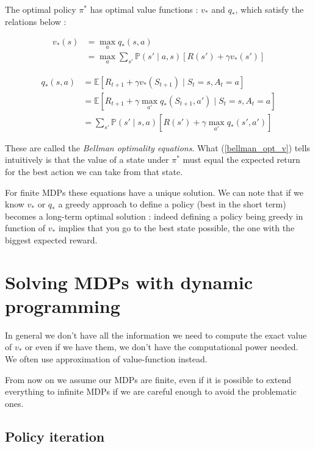 \documentclass[14pt,a4paper]{article}
\theoremstyle{definition}
\begin{document}
The optimal policy $\pi^*$ has  optimal value functions : $v_* $ and $ q_*$, which satisfy the relations below : 

\begin{equation}
\begin{split}
v_{*}(s)&=\max_{a}q_{*}(s,a)
\\&=\max_{a} \sum_{s'}\mathbb{P}(s'\mid a,s)\left[R(s')+\gamma v_{*}(s')\right]
\end{split}
\label{bellman_opt_v}
\end{equation}

\begin{equation}
\begin{split}
q_{*}(s,a)&=\mathbb{E}\left[ R_{t+1} + \gamma v_{*}(S_ {t+1}) \mid S_t = s, A_t = a \right]
\\&=\mathbb{E}\left[ R_{t+1} + \gamma \max_{a'} q_{*}(S_{t+1},a') \mid S_t = s, A_t = a \right]
\\&= \sum_{s'}\mathbb{P}(s' \mid s,a)[R(s')+\gamma \max_{a'}q_{*}(s',a')]
\end{split}
\label{bellman_opt_q}
\end{equation}

These are called the \emph{Bellman optimality equations}. What (\ref{bellman_opt_v}) tells intuitively is that the value of a state under $\pi^*$ must equal the expected return for the best action we can take from that state.


For finite MDPs these equations have a unique solution. We can note that if we know $v_{*}$ or $q_{*}$ a greedy approach to define a policy (best in the short term) becomes a long-term optimal solution : indeed defining a policy being greedy in function of $v_*$ implies that you go to the best state possible, the one with the biggest expected reward.


\section{Solving MDPs with dynamic programming}

In general we don't have all the information we need to compute the exact value of $v_{*}$ or even if we have them, we don't have the computational 
power needed. We often use approximation of value-function instead.


From now on we assume our MDPs are finite, even if it is possible to extend everything to infinite MDPs if we are careful enough to avoid the problematic ones. \citep{Sutton}

\subsection{Policy iteration}
\end{document}
